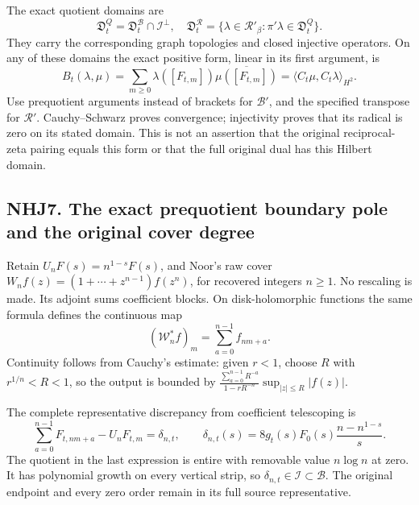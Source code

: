 The exact quotient domains are \[
\mathfrak D_t^Q=\mathfrak D_t^{\mathcal B}\cap\mathcal I^\perp,
\quad
\mathfrak D_t^{\mathcal R}=
\{\lambda\in\mathcal R'_\beta:\pi'\lambda\in\mathfrak D_t^Q\}.
\tag{NHJ6.3}
\] They carry the corresponding graph topologies and closed injective
operators. On any of these domains the exact positive form, linear in
its first argument, is \[
B_t(\lambda,\mu)=\sum_{m\ge0}
\lambda([F_{t,m}])\overline{\mu([F_{t,m}])}
=\langle C_t\mu,C_t\lambda\rangle_{H^2}.
\tag{NHJ6.4}
\] Use prequotient arguments instead of brackets for \(\mathcal B'\),
and the specified transpose for \(\mathcal R'\). Cauchy--Schwarz proves
convergence; injectivity proves that its radical is zero on its stated
domain. This is not an assertion that the original reciprocal-zeta
pairing equals this form or that the full original dual has this Hilbert
domain.

\subsection{NHJ7. The exact prequotient boundary pole and the original
cover
degree}\label{nhj7.-the-exact-prequotient-boundary-pole-and-the-original-cover-degree}

Retain \(U_nF(s)=n^{1-s}F(s)\), and Noor's raw cover
\(W_nf(z)=(1+\cdots+z^{n-1})f(z^n)\), for recovered integers \(n\ge1\).
No rescaling is made. Its adjoint sums coefficient blocks. On
disk-holomorphic functions the same formula defines the continuous map
\[
(\mathscr W_n^*f)_m=\sum_{a=0}^{n-1}f_{nm+a}.
\tag{NHJ7.1}
\] Continuity follows from Cauchy's estimate: given \(r<1\), choose
\(R\) with \(r^{1/n}<R<1\), so the output is bounded by
\(\frac{\sum_{a=0}^{n-1}R^{-a}}{1-rR^{-n}}\sup_{|z|\le R}|f(z)|\).

The complete representative discrepancy from coefficient telescoping is
\[
\sum_{a=0}^{n-1}F_{t,nm+a}-U_nF_{t,m}
=\delta_{n,t},\qquad
\delta_{n,t}(s)=8g_t(s)F_0(s)\frac{n-n^{1-s}}s.
\tag{NHJ7.2}
\] The quotient in the last expression is entire with removable value
\(n\log n\) at zero. It has polynomial growth on every vertical strip,
so \(\delta_{n,t}\in\mathcal I\subset\mathcal B\). The original endpoint
and every zero order remain in its full source representative.

